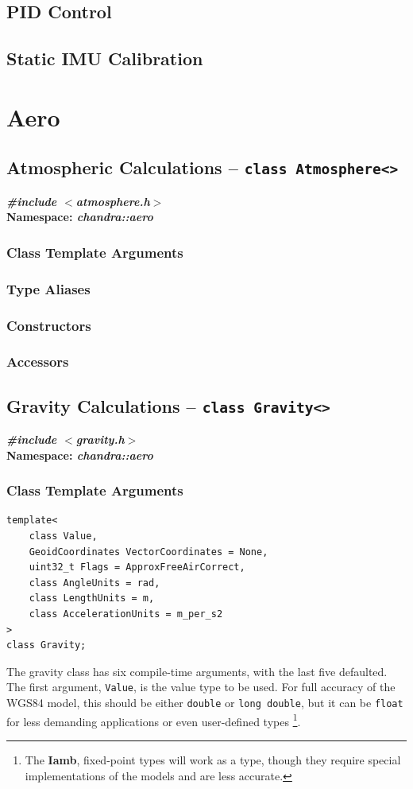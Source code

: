 \documentclass[10pt,letterpaper]{memoir} %
\newcommand{\apiheader}[2]{\noindent{}\textbf{\emph{\#include $<$#1$>$}}\\\noindent{}\textbf{Namespace: \emph{#2}}}
\begin{document}
\section{PID Control}
\section{Static IMU Calibration}

\chapter{Aero}
\section{Atmospheric Calculations -- \texttt{class Atmosphere<>}}
\label{sec:atmosphere:calculation:api}
\apiheader{atmosphere.h}{chandra::aero}
\subsection{Class Template Arguments}
\subsection{Type Aliases}
\subsection{Constructors}
\subsection{Accessors}

\section{Gravity Calculations -- \texttt{class Gravity<>}}
\label{sec:gravity:calculation:api}
\apiheader{gravity.h}{chandra::aero}
\subsection{Class Template Arguments}
\begin{verbatim}
template<
	class Value,
	GeoidCoordinates VectorCoordinates = None,
	uint32_t Flags = ApproxFreeAirCorrect,
	class AngleUnits = rad,
	class LengthUnits = m,
	class AccelerationUnits = m_per_s2
>
class Gravity;	
\end{verbatim}
The gravity class has six compile-time arguments, with the last five defaulted.  The first argument, \texttt{Value}, is the value type to be used.  For full accuracy of the WGS84 model, this should be either \texttt{double} or \texttt{long double}, but it can be \texttt{float} for less demanding applications or even user-defined types \footnote{The \textbf{Iamb}, fixed-point types will work as a type, though they require special implementations of the models and are less accurate.}.  
\end{document}
